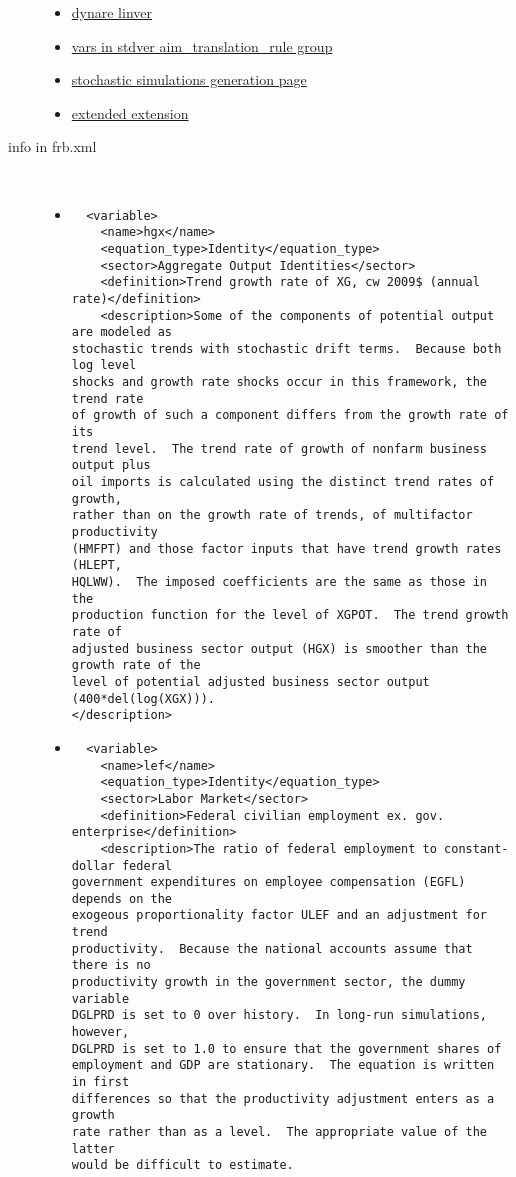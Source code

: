 \documentclass[12pt]{article}
\begin{document}
\begin{description}
\begin{itemize}
\item \href{/mq/home/develop/frbus/models/develop/linver/mcapwp/linver_mcapwp_eviews_mod.txt}{dynare linver}
  \item \href{http://www.rsma.frb.gov/cgi-bin/mq/maqswin/varinfo_by_attribute.pl}{vars in stdver aim\_translation\_rule group}
  \item \href{http://www.rsma.frb.gov/cgi-bin/mq/maqswin/stoch_sim_eviews.pl}{stochastic simulations generation page}
  \item \href{https://www.rsma.frb.gov/twiki/bin/view/RSMAQS/ExtendedExtension}{extended extension}
  \end{itemize}
\item[info in frb.xml] \ 
  \begin{itemize}
  \item 
\begin{verbatim}
  <variable>
    <name>hgx</name>
    <equation_type>Identity</equation_type>
    <sector>Aggregate Output Identities</sector>
    <definition>Trend growth rate of XG, cw 2009$ (annual rate)</definition>
    <description>Some of the components of potential output are modeled as
stochastic trends with stochastic drift terms.  Because both log level
shocks and growth rate shocks occur in this framework, the trend rate
of growth of such a component differs from the growth rate of its
trend level.  The trend rate of growth of nonfarm business output plus
oil imports is calculated using the distinct trend rates of growth,
rather than on the growth rate of trends, of multifactor productivity
(HMFPT) and those factor inputs that have trend growth rates (HLEPT,
HQLWW).  The imposed coefficients are the same as those in the
production function for the level of XGPOT.  The trend growth rate of
adjusted business sector output (HGX) is smoother than the growth rate of the
level of potential adjusted business sector output (400*del(log(XGX))).
</description>

\end{verbatim}
  \item 
\begin{verbatim}
  <variable>
    <name>lef</name>
    <equation_type>Identity</equation_type>
    <sector>Labor Market</sector>
    <definition>Federal civilian employment ex. gov. enterprise</definition>
    <description>The ratio of federal employment to constant-dollar federal
government expenditures on employee compensation (EGFL) depends on the
exogeous proportionality factor ULEF and an adjustment for trend
productivity.  Because the national accounts assume that there is no
productivity growth in the government sector, the dummy variable
DGLPRD is set to 0 over history.  In long-run simulations, however,
DGLPRD is set to 1.0 to ensure that the government shares of
employment and GDP are stationary.  The equation is written in first
differences so that the productivity adjustment enters as a growth
rate rather than as a level.  The appropriate value of the latter
would be difficult to estimate.


\end{verbatim}
\end{itemize}
\end{description}
\end{document}
